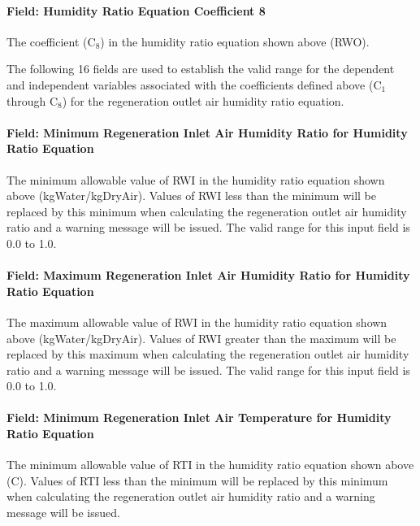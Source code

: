 \paragraph{Field: Humidity Ratio Equation Coefficient 8}\label{field-humidity-ratio-equation-coefficient-8}

The coefficient (C\(_{8}\)) in the humidity ratio equation shown above (RWO).

The following 16 fields are used to establish the valid range for the dependent and independent variables associated with the coefficients defined above (C\(_{1}\) through C\(_{8}\)) for the regeneration outlet air humidity ratio equation.

\paragraph{Field: Minimum Regeneration Inlet Air Humidity Ratio for Humidity Ratio Equation}\label{field-minimum-regeneration-inlet-air-humidity-ratio-for-humidity-ratio-equation}

The minimum allowable value of RWI in the humidity ratio equation shown above (kgWater/kgDryAir). Values of RWI less than the minimum will be replaced by this minimum when calculating the regeneration outlet air humidity ratio and a warning message will be issued. The valid range for this input field is 0.0 to 1.0.

\paragraph{Field: Maximum Regeneration Inlet Air Humidity Ratio for Humidity Ratio Equation}\label{field-maximum-regeneration-inlet-air-humidity-ratio-for-humidity-ratio-equation}

The maximum allowable value of RWI in the humidity ratio equation shown above (kgWater/kgDryAir). Values of RWI greater than the maximum will be replaced by this maximum when calculating the regeneration outlet air humidity ratio and a warning message will be issued. The valid range for this input field is 0.0 to 1.0.

\paragraph{Field: Minimum Regeneration Inlet Air Temperature for Humidity Ratio Equation}\label{field-minimum-regeneration-inlet-air-temperature-for-humidity-ratio-equation}

The minimum allowable value of RTI in the humidity ratio equation shown above (C). Values of RTI less than the minimum will be replaced by this minimum when calculating the regeneration outlet air humidity ratio and a warning message will be issued.

